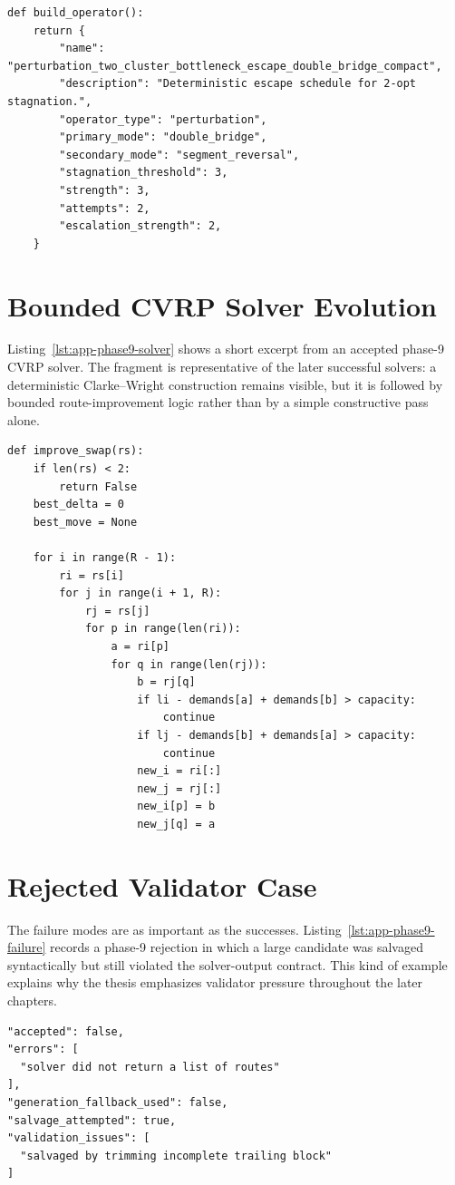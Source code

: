 \begin{lstlisting}[caption={Phase-7 perturbation operator from the rediscovered double-bridge family.},label={lst:app-phase7-operator}]
def build_operator():
    return {
        "name": "perturbation_two_cluster_bottleneck_escape_double_bridge_compact",
        "description": "Deterministic escape schedule for 2-opt stagnation.",
        "operator_type": "perturbation",
        "primary_mode": "double_bridge",
        "secondary_mode": "segment_reversal",
        "stagnation_threshold": 3,
        "strength": 3,
        "attempts": 2,
        "escalation_strength": 2,
    }
\end{lstlisting}

\section{Bounded CVRP Solver Evolution}
\label{sec:appendix-phase9-solver}

Listing~\ref{lst:app-phase9-solver} shows a short excerpt from an accepted phase-9 CVRP solver.
The fragment is representative of the later successful solvers: a deterministic Clarke--Wright
construction remains visible, but it is followed by bounded route-improvement logic rather than by
a simple constructive pass alone.

\begin{lstlisting}[caption={Accepted phase-9 CVRP solver fragment.},label={lst:app-phase9-solver}]
def improve_swap(rs):
    if len(rs) < 2:
        return False
    best_delta = 0
    best_move = None

    for i in range(R - 1):
        ri = rs[i]
        for j in range(i + 1, R):
            rj = rs[j]
            for p in range(len(ri)):
                a = ri[p]
                for q in range(len(rj)):
                    b = rj[q]
                    if li - demands[a] + demands[b] > capacity:
                        continue
                    if lj - demands[b] + demands[a] > capacity:
                        continue
                    new_i = ri[:]
                    new_j = rj[:]
                    new_i[p] = b
                    new_j[q] = a
\end{lstlisting}

\section{Rejected Validator Case}
\label{sec:appendix-phase9-failure}

The failure modes are as important as the successes. Listing~\ref{lst:app-phase9-failure} records
a phase-9 rejection in which a large candidate was salvaged syntactically but still violated the
solver-output contract. This kind of example explains why the thesis emphasizes validator pressure
throughout the later chapters.

\begin{lstlisting}[caption={Phase-9 rejection record with validator failure.},label={lst:app-phase9-failure},language={}]
"accepted": false,
"errors": [
  "solver did not return a list of routes"
],
"generation_fallback_used": false,
"salvage_attempted": true,
"validation_issues": [
  "salvaged by trimming incomplete trailing block"
]
\end{lstlisting}
